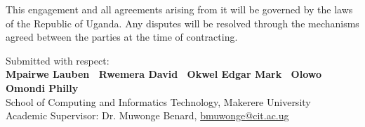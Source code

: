 \documentclass[11pt,a4paper]{article}
\begin{document}
This engagement and all agreements arising from it will be governed by the laws of the Republic of Uganda. Any disputes will be resolved through the mechanisms agreed between the parties at the time of contracting.

\vspace{1.5cm}
\noindent\hrulefill
\vspace{0.8cm}

\begin{center}
Submitted with respect:\\[0.6em]
{\bfseries Mpairwe Lauben \textbullet\ Rwemera David \textbullet\ Okwel Edgar Mark \textbullet\ Olowo Omondi Philly}\\[0.6em]
School of Computing and Informatics Technology, Makerere University\\[0.3em]
Academic Supervisor: Dr. Muwonge Benard, \href{mailto:bmuwonge@cit.ac.ug}{bmuwonge@cit.ac.ug}
\end{center}
\end{document}
